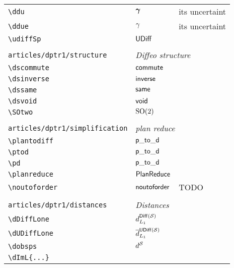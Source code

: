 \begin{longtable}{lll}
 {\color[rgb]{0.5,0.5,0.5}\texttt{\textbackslash ddu}} & $\boldsymbol{\gamma}$ &  its uncertaint\\ 
 {\color[rgb]{0.5,0.5,0.5}\texttt{\textbackslash ddue}} & $\gamma$ &  its uncertaint\\ 
 {\color[rgb]{0.5,0.5,0.5}\texttt{\textbackslash udiffSp}} & $\mathsf{UDiff}$ & \\ 
  &  & \\ 
 {\color[rgb]{0.5,0.5,0.5}\texttt{articles/dptr1/structure}} & \multicolumn{2}{l}{\emph{Diffeo structure}}\\ 
 \hline
{\color[rgb]{0.5,0.5,0.5}\texttt{\textbackslash dscommute}} & $\mathsf{commute}$ & \\ 
 {\color[rgb]{0.5,0.5,0.5}\texttt{\textbackslash dsinverse}} & $\mathsf{inverse}$ & \\ 
 {\color[rgb]{0.5,0.5,0.5}\texttt{\textbackslash dssame}} & $\mathsf{same}$ & \\ 
 {\color[rgb]{0.5,0.5,0.5}\texttt{\textbackslash dsvoid}} & $\mathsf{void}$ & \\ 
 {\color[rgb]{0.5,0.5,0.5}\texttt{\textbackslash SOtwo}} & $\mathrm{SO}(2)$ & \\ 
  &  & \\ 
 {\color[rgb]{0.5,0.5,0.5}\texttt{articles/dptr1/simplification}} & \multicolumn{2}{l}{\emph{plan reduce}}\\ 
 \hline
{\color[rgb]{0.5,0.5,0.5}\texttt{\textbackslash plantodiff}} & $\mathsf{p\_to\_d}$ & \\ 
 {\color[rgb]{0.5,0.5,0.5}\texttt{\textbackslash ptod}} & $\mathsf{p\_to\_d}$ & \\ 
 {\color[rgb]{0.5,0.5,0.5}\texttt{\textbackslash pd}} & $\mathsf{p\_to\_d}$ & \\ 
 {\color[rgb]{0.5,0.5,0.5}\texttt{\textbackslash planreduce}} & $\mathsf{PlanReduce}$ & \\ 
 {\color[rgb]{0.5,0.5,0.5}\texttt{\textbackslash noutoforder}} & $\mathsf{noutoforder}$ &  TODO\\ 
  &  & \\ 
 {\color[rgb]{0.5,0.5,0.5}\texttt{articles/dptr1/distances}} & \multicolumn{2}{l}{\emph{Distances}}\\ 
 \hline
{\color[rgb]{0.5,0.5,0.5}\texttt{\textbackslash dDiffLone}} & $\dDiffLone$ & \\ 
 {\color[rgb]{0.5,0.5,0.5}\texttt{\textbackslash dUDiffLone}} & $\dUDiffLone$ & \\ 
 {\color[rgb]{0.5,0.5,0.5}\texttt{\textbackslash dobsps}} & $\dobsps$ & \\ 
 {\color[rgb]{0.5,0.5,0.5}\texttt{\textbackslash dImL\{...\}}} &  & \\ 

\end{longtable}
